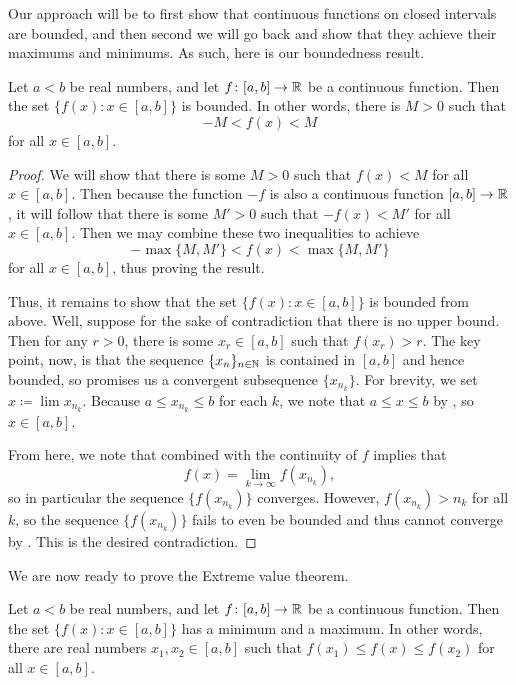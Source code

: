 \documentclass[../notes.tex]{subfiles}
\begin{document}
Our approach will be to first show that continuous functions on closed intervals are bounded, and then second we will go back and show that they achieve their maximums and minimums. As such, here is our boundedness result.
\begin{proposition} \label{prop:bounded-func}
    Let $a<b$ be real numbers, and let $f\colon[a,b]\to\mathbb R$ be a continuous function. Then the set $\{f(x):x\in[a,b]\}$ is bounded. In other words, there is $M>0$ such that
    \[-M<f(x)<M\]
    for all $x\in[a,b]$.
\end{proposition}
\begin{proof}
    We will show that there is some $M>0$ such that $f(x)<M$ for all $x\in[a,b]$. Then because the function $-f$ is also a continuous function $[a,b]\to\mathbb R$, it will follow that there is some $M'>0$ such that $-f(x)<M'$ for all $x\in[a,b]$. Then we may combine these two inequalities to achieve
    \[-\max\{M,M'\}<f(x)<\max\{M,M'\}\]
    for all $x\in[a,b]$, thus proving the result.

    Thus, it remains to show that the set $\{f(x):x\in[a,b]\}$ is bounded from above. Well, suppose for the sake of contradiction that there is no upper bound. Then for any $r>0$, there is some $x_r\in[a,b]$ such that $f(x_r)>r$. The key point, now, is that the sequence $\{x_n\}_{n\in\mathbb N}$ is contained in $[a,b]$ and hence bounded, so  promises us a convergent subsequence $\{x_{n_k}\}$. For brevity, we set $x\coloneqq\lim x_{n_k}$. Because $a\le x_{n_k}\le b$ for each $k$, we note that $a\le x\le b$ by , so $x\in[a,b]$.

    From here, we note that  combined with the continuity of $f$ implies that
    \[f(x)=\lim_{k\to\infty}f(x_{n_k}),\]
    so in particular the sequence $\{f(x_{n_k})\}$ converges. However, $f(x_{n_k})>n_k$ for all $k$, so the sequence $\{f(x_{n_k})\}$ fails to even be bounded and thus cannot converge by . This is the desired contradiction.
\end{proof}
We are now ready to prove the Extreme value theorem.
\begin{theorem}
    Let $a<b$ be real numbers, and let $f\colon[a,b]\to\mathbb R$ be a continuous function. Then the set $\{f(x):x\in[a,b]\}$ has a minimum and a maximum. In other words, there are real numbers $x_1,x_2\in[a,b]$ such that $f(x_1)\le f(x)\le f(x_2)$ for all $x\in[a,b]$.
\end{theorem}
\end{document}
